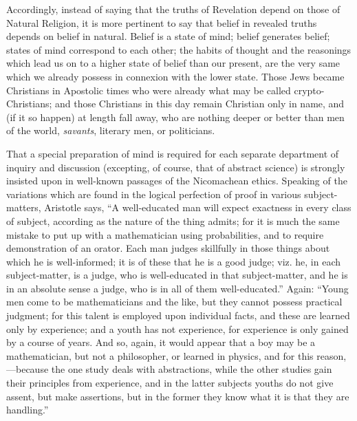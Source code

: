 Accordingly, instead of saying that the truths of Revelation depend
on those of Natural Religion, it is more pertinent to say that belief
in revealed truths depends on belief in natural. Belief is a state of
mind; belief generates belief; states of mind correspond to each
other; the habits of thought and the reasonings which lead us on to a
higher state of belief than our present, are the very same which we
already possess in connexion with the lower state. Those Jews became
Christians in Apostolic times who were already what may be
called crypto-Christians; and those Christians in this day remain
Christian only in name, and (if it so happen) at length fall away, who
are nothing deeper or better than men of the world, \emph{savants},
literary men, or politicians.

That a special preparation of mind is required for each separate
department of inquiry and discussion (excepting, of course, that of
abstract science) is strongly insisted upon in well-known passages of
the Nicomachean ethics. Speaking of the variations which are found in
the logical perfection of proof in various subject-matters, Aristotle
says, ``A well-educated man will expect exactness in every class
of subject, according as the nature of the thing admits; for it is
much the same mistake to put up with a mathematician using
probabilities, and to require demonstration of an orator. Each man
judges skillfully in those things about which he is well-informed; it
is of these that he is a good judge; viz. he, in each subject-matter,
is a judge, who is well-educated in that subject-matter, and he is in
an absolute sense a judge, who is in all of them well-educated.''
Again: ``Young men come to be mathematicians and the like, but
they cannot possess practical judgment; for this talent is employed
upon individual facts, and these are learned only by experience; and a
youth has not experience, for experience is only gained by a course of
years. And so, again, it would appear that a boy may be a
mathematician, but not a philosopher, or learned in physics, and for
this reason,—because the one study deals with abstractions, while
the other studies gain their principles from experience, and in
the latter subjects youths do not give assent, but make assertions,
but in the former they know what it is that they are handling.''

